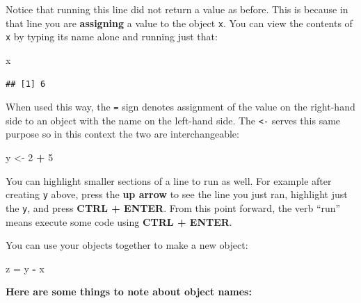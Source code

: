\documentclass[]{book}
\newenvironment{Shaded}{\begin{snugshade}}{\end{snugshade}}
\newcommand{\DecValTok}[1]{\textcolor[rgb]{0.00,0.00,0.81}{#1}}
\newcommand{\StringTok}[1]{\textcolor[rgb]{0.31,0.60,0.02}{#1}}
\newcommand{\OperatorTok}[1]{\textcolor[rgb]{0.81,0.36,0.00}{\textbf{#1}}}
\newcommand{\NormalTok}[1]{#1}
\theoremstyle{definition}
\theoremstyle{definition}
\theoremstyle{definition}
\theoremstyle{remark}
\begin{document}
Notice that running this line did not return a value as before. This is
because in that line you are \textbf{assigning} a value to the object
\texttt{x}. You can view the contents of \texttt{x} by typing its name
alone and running just that:

\begin{Shaded}
\begin{Highlighting}[]
\NormalTok{x}
\end{Highlighting}
\end{Shaded}

\begin{verbatim}
## [1] 6
\end{verbatim}

When used this way, the \texttt{=} sign denotes assignment of the value
on the right-hand side to an object with the name on the left-hand side.
The \texttt{\textless{}-} serves this same purpose so in this context
the two are interchangeable:

\begin{Shaded}
\begin{Highlighting}[]
\NormalTok{y <-}\StringTok{ }\DecValTok{2} \OperatorTok{+}\StringTok{ }\DecValTok{5}
\end{Highlighting}
\end{Shaded}

You can highlight smaller sections of a line to run as well. For example
after creating \texttt{y} above, press the \textbf{up arrow} to see the
line you just ran, highlight just the \texttt{y}, and press \textbf{CTRL
+ ENTER}. From this point forward, the verb ``run'' means execute some
code using \textbf{CTRL + ENTER}.

You can use your objects together to make a new object:

\begin{Shaded}
\begin{Highlighting}[]
\NormalTok{z =}\StringTok{ }\NormalTok{y }\OperatorTok{-}\StringTok{ }\NormalTok{x}
\end{Highlighting}
\end{Shaded}

\textbf{Here are some things to note about object names:}
\end{document}
